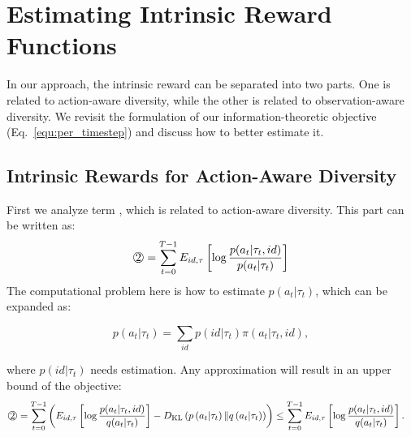 \newpage
\section{Estimating Intrinsic Reward Functions}\label{appe:rewards}

In our approach, the intrinsic reward can be separated into two parts. One is related to action-aware diversity, while the other is related to observation-aware diversity. We revisit the formulation of our information-theoretic objective (Eq.~\ref{equ:per_timestep}) and discuss how to better estimate it.

\subsection{Intrinsic Rewards for Action-Aware Diversity}
\label{sec:intrinsic_policy}

First we analyze term , which is related to action-aware diversity. This part can be written as:
\begin{equation}
\begin{aligned} 
\raisebox{.5pt}{\textcircled{\raisebox{-.9pt}{2}}}=\sum_{t=0}^{T-1}E_{i d, \tau}\left[ \log \frac{p(a_t| \tau_t, id)}{p(a_t| \tau_t)}\right]
\end{aligned}
\end{equation}
The computational problem here is how to estimate $p\left(a_{t} | \tau_{t}\right)$, which can be expanded as:

\begin{equation}
p\left(a_{t} | \tau_{t}\right)=\sum_{i d} p\left(i d | \tau_{t}\right) \pi\left(a_{t} | \tau_{t}, i d\right),
\end{equation}

where $p\left(i d | \tau_{t}\right)$ needs estimation. Any approximation will result in an upper bound of the objective:
\begin{equation}
\begin{aligned} 
\raisebox{.5pt}{\textcircled{\raisebox{-.9pt}{2}}}
&=\sum_{t=0}^{T-1}\left(E_{i d, \tau}\left[ \log \frac{p(a_t| \tau_t, id)}{q(a_t| \tau_t)}\right] - D_{\mathrm{KL}}\left(p\left(a_{t} | \tau_{t}\right)  \| q\left(a_{t} |  \tau_{t}\right)\right)\right) \leq \sum_{t=0}^{T-1}E_{i d, \tau}\left[ \log \frac{p(a_t| \tau_t, id)}{q(a_t| \tau_t)}\right].
\end{aligned}
\label{eq:flaw1}
\end{equation}


